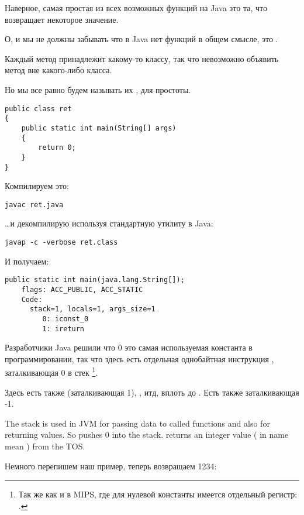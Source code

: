 
Наверное, самая простая из всех возможных функций на Java это та, что возвращает 
некоторое значение.

О, и мы не должны забывать что в Java нет  функций в общем смысле,
это .

Каждый метод принадлежит какому-то классу, так что невозможно объявить метод 
вне какого-либо класса.

Но мы все равно будем называть их , для простоты.

\begin{lstlisting}
public class ret
{
	public static int main(String[] args) 
	{
		return 0;
	}
}
\end{lstlisting}

Компилируем это:

\begin{lstlisting}
javac ret.java
\end{lstlisting}

\dots и декомпилирую используя стандартную утилиту в Java:

\begin{lstlisting}
javap -c -verbose ret.class
\end{lstlisting}

И получаем:

\begin{lstlisting}[caption=JDK 1.7 (excerpt)]
  public static int main(java.lang.String[]);
    flags: ACC_PUBLIC, ACC_STATIC
    Code:
      stack=1, locals=1, args_size=1
         0: iconst_0      
         1: ireturn       
\end{lstlisting}

Разработчики Java решили что 0 это самая используемая константа в программировании,
так что здесь есть отдельная однобайтная инструкция , заталкивающая 0 в стек
\footnote{Так же как и в MIPS, где для нулевой константы имеется отдельный регистр: .}.

Здесь есть также  (заталкивающая 1), , итд, 
вплоть до .
Есть также  заталкивающая -1.

The stack is used in JVM for passing data to called functions and also for returning values.
So  pushes 0 into the stack.
 returns an integer value ( in name mean ) from the \ac{TOS}.

Немного перепишем наш пример, теперь возвращаем 1234:

